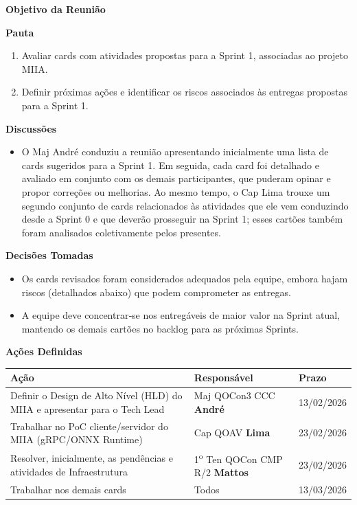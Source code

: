 \documentclass[12pt,a4paper]{article}
\newcommand{\meetingobjective}{}
\begin{document}
\textbf{Objetivo da Reunião}

\meetingobjective

\vspace{1em}

\textbf{Pauta}

\begin{enumerate}
\item Avaliar cards com atividades propostas para a Sprint 1, associadas ao projeto MIIA.
\item Definir próximas ações e identificar os riscos associados às entregas propostas para a Sprint 1.
\end{enumerate}

\vspace{1em}

\textbf{Discussões}

\begin{itemize}
\item O Maj André conduziu a reunião apresentando inicialmente uma lista de cards sugeridos para a Sprint 1. Em seguida, cada card foi detalhado e avaliado em conjunto com os demais participantes, que puderam opinar e propor correções ou melhorias. Ao mesmo tempo, o Cap Lima trouxe um segundo conjunto de cards relacionados às atividades que ele vem conduzindo desde a Sprint 0 e que deverão prosseguir na Sprint 1; esses cartões também foram analisados coletivamente pelos presentes.
\end{itemize}

\vspace{1em}

\textbf{Decisões Tomadas}

\begin{itemize}
\item Os cards revisados foram considerados adequados pela equipe, embora hajam riscos (detalhados abaixo) que podem comprometer as entregas.
\item A equipe deve concentrar‑se nos entregáveis de maior valor na Sprint atual, mantendo os demais cartões no backlog para as próximas Sprints.
\end{itemize}

\vspace{1em}

\textbf{Ações Definidas}

\begin{longtable}{|p{6cm}|p{4cm}|p{3cm}|}
\hline
\textbf{Ação} & \textbf{Responsável} & \textbf{Prazo} \\
\hline
 Definir o Design de Alto Nível (HLD) do MIIA e apresentar para o Tech Lead & Maj QOCon3 CCC \textbf{André} & 13/02/2026 \\
\hline
 Trabalhar no PoC cliente/servidor do MIIA (gRPC/ONNX Runtime) & Cap QOAV \textbf{Lima} & 23/02/2026 \\
\hline
 Resolver, inicialmente, as pendências e atividades de Infraestrutura  & 1\textsuperscript{o} Ten QOCon CMP R/2 \textbf{Mattos} & 23/02/2026 \\
\hline
 Trabalhar nos demais cards  & Todos & 13/03/2026 \\
\hline
\end{longtable}
\end{document}
